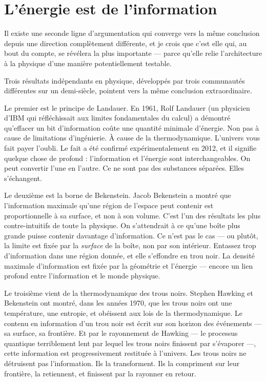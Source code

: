 \documentclass[11pt, twoside, openright]{book}
\begin{document}
\section*{L'énergie est de l'information}

Il existe une seconde ligne d'argumentation qui converge vers la même conclusion depuis une direction complètement différente, et je crois que c'est elle qui, au bout du compte, se révélera la plus importante --- parce qu'elle relie l'architecture à la physique d'une manière potentiellement testable.

Trois résultats indépendants en physique, développés par trois communautés différentes sur un demi-siècle, pointent vers la même conclusion extraordinaire.

Le premier est le principe de Landauer. En 1961, Rolf Landauer (un physicien d'IBM qui réfléchissait aux limites fondamentales du calcul) a démontré qu'effacer un bit d'information coûte une quantité minimale d'énergie. Non pas à cause de limitations d'ingénierie. À cause de la thermodynamique. L'univers vous fait payer l'oubli. Le fait a été confirmé expérimentalement en 2012, et il signifie quelque chose de profond : l'information et l'énergie sont interchangeables. On peut convertir l'une en l'autre. Ce ne sont pas des substances séparées. Elles s'échangent.

Le deuxième est la borne de Bekenstein. Jacob Bekenstein a montré que l'information maximale qu'une région de l'espace peut contenir est proportionnelle à sa surface, et non à son volume. C'est l'un des résultats les plus contre-intuitifs de toute la physique. On s'attendrait à ce qu'une boîte plus grande puisse contenir davantage d'information. Ce n'est pas le cas --- ou plutôt, la limite est fixée par la \textit{surface} de la boîte, non par son intérieur. Entassez trop d'information dans une région donnée, et elle s'effondre en trou noir. La densité maximale d'information est fixée par la géométrie et l'énergie --- encore un lien profond entre l'information et le monde physique.

Le troisième vient de la thermodynamique des trous noirs. Stephen Hawking et Bekenstein ont montré, dans les années 1970, que les trous noirs ont une température, une entropie, et obéissent aux lois de la thermodynamique. Le contenu en information d'un trou noir est écrit sur son horizon des événements --- sa surface, sa frontière. Et par le rayonnement de Hawking --- le processus quantique terriblement lent par lequel les trous noirs finissent par s'évaporer ---, cette information est progressivement restituée à l'univers. Les trous noirs ne détruisent pas l'information. Ils la transforment. Ils la compriment sur leur frontière, la retiennent, et finissent par la rayonner en retour.
\end{document}
